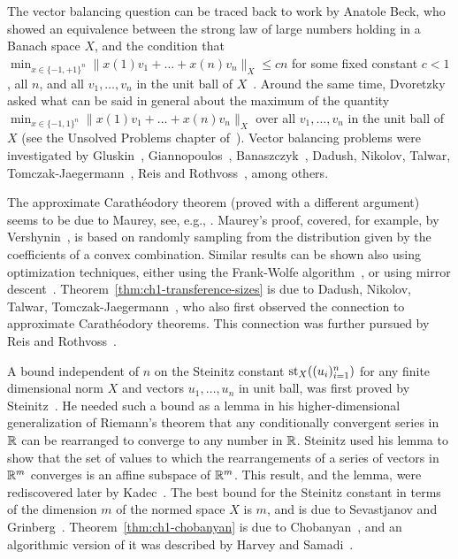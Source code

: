 The vector
balancing question can be traced back to work by Anatole Beck, who
showed an equivalence between the strong law of large numbers holding
in a Banach space $X$, and the condition that
$\min_{x \in \{-1,+1\}^n}\|x(1) v_1 + \ldots + x(n) v_n\|_X \le cn$ for
some fixed constant $c < 1$, all $n$, and all $v_1, \ldots, v_n$ in
the unit ball of $X$~\cite{ABeck62}. Around the same time, Dvoretzky asked what can be said in
general about the maximum of the quantity $\min_{x \in \{-1,1\}^n}\|x(1) v_1 + \ldots
+ x(n) v_n\|_X$ over all $v_1, \ldots, v_n$ in the unit ball of
$X$ (see the Unsolved Problems chapter of~\cite{Dvoretzky-problem}). 
Vector balancing problems were
investigated by Gluskin~\cite{Glu89}, Giannopoulos~\cite{Gia93},
Banaszczyk~\cite{Bana93,Bana98}, Dadush, Nikolov, Talwar,
Tomczak-Jaegermann~\cite{anynorm}, Reis and Rothvoss~\cite{ReisR23}, among others. %

The approximate Carath\'eodory theorem (proved with a different
argument) seems to be due to Maurey, see, e.g.,
\cite{Pisier81}. Maurey's proof, covered, for example, by
Vershynin~\cite{vershynin}, is based on randomly sampling from the
distribution given by the coefficients of a convex
combination. Similar results can be shown also using optimization
techniques, either using the Frank-Wolfe algorithm~\cite{CP23}, or using mirror
descent~\cite{MLVW17}. Theorem~\ref{thm:ch1-transference-sizes} is due to Dadush, Nikolov, Talwar,
Tomczak-Jaegermann~\cite{anynorm}, who also first observed the
connection to approximate Carath\'eodory theorems. This connection was
further pursued by Reis and Rothvoss~\cite{RR22-apxcar}.


A bound independent of $n$ on the Steinitz constant $\operatorname{st}_X((u_i)_{i=1}^n)$ for any finite
dimensional norm $X$ and vectors $u_1, \ldots, u_n$ in unit ball,
was first proved by Steinitz~\cite{Steinitz1913}. He needed such a
bound as a lemma in his higher-dimensional generalization of Riemann's theorem that any
conditionally convergent series in $\mathbb{R}$ can be rearranged to converge
to any number in $\mathbb{R}$. Steinitz used his lemma to show that the set of
values to which the rearrangements of a series of vectors in $\mathbb{R}^m$
converges is an affine subspace of $\mathbb{R}^m$. This result, and the lemma,
were rediscovered later by Kadec~\cite{Kadec53}.  The best bound for
the Steinitz constant in terms of the dimension $m$ of the normed space $X$ is $m$, and is due to Sevastjanov
and Grinberg~\cite{Sev78,GS80}. Theorem~\ref{thm:ch1-chobanyan} is due to Chobanyan~\cite{Chobanyan94}, and an algorithmic version of it was described by Harvey and Samadi~\cite{HarveySamadi14}.


